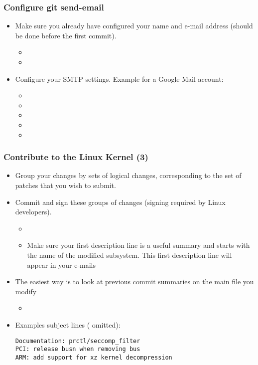 \begin{frame}
  \frametitle{Configure git send-email}
  \begin{itemize}
  \item Make sure you already have configured your name and e-mail
    address (should be done before the first commit).
    \begin{itemize}
    \item {}
    \item {}
    \end{itemize}
  \item Configure your SMTP settings. Example for a Google Mail
    account:
    \begin{itemize}
    \item {}
    \item {}
    \item {}
    \item {}
    \item {}
    \end{itemize}
  \end{itemize}
\end{frame}

\begin{frame}[fragile]
  \frametitle{Contribute to the Linux Kernel (3)}
  \begin{itemize}
  \item Group your changes by sets of logical changes, corresponding
    to the set of patches that you wish to submit.
  \item Commit and sign these groups of changes (signing required by
    Linux developers).
    \begin{itemize}
    \item {}
    \item Make sure your first description line is a useful summary
      and starts with the name of the modified subsystem. This first
      description line will appear in your e-mails
    \end{itemize}
  \item The easiest way is to look at previous commit summaries on the
    main file you modify
      \begin{itemize}
      \item {}
      \end{itemize}
  \item Examples subject lines (\code{[PATCH]} omitted):
\begin{verbatim}
Documentation: prctl/seccomp_filter
PCI: release busn when removing bus
ARM: add support for xz kernel decompression
\end{verbatim}
  \end{itemize}
\end{frame}

